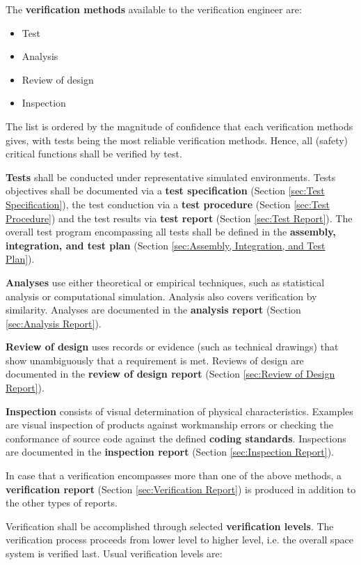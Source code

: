 The \textbf{verification methods} available to the verification engineer are:

\begin{itemize}
\item Test
\item Analysis
\item Review of design
\item Inspection
\end{itemize}

The list is ordered by the magnitude of confidence that each verification methods gives, with tests being the most reliable verification methods. Hence, all (safety) critical functions shall be verified by test.

\textbf{Tests} shall be conducted under representative simulated environments. Tests objectives shall be documented via a \textbf{test specification} (Section \ref{sec:Test Specification}), the test conduction via a \textbf{test procedure} (Section \ref{sec:Test Procedure}) and the test results via \textbf{test report} (Section \ref{sec:Test Report}). The overall test program encompassing all tests shall be defined in the \textbf{assembly, integration, and test plan} (Section \ref{sec:Assembly, Integration, and Test Plan}).

\textbf{Analyses} use either theoretical or empirical techniques, such as statistical analysis or computational simulation. Analysis also covers verification by similarity. Analyses are documented in the \textbf{analysis report} (Section \ref{sec:Analysis Report}).

\textbf{Review of design} uses records or evidence (such as technical drawings) that show unambiguously that a requirement is met. Reviews of design are documented in the \textbf{review of design report} (Section \ref{sec:Review of Design Report}).

\textbf{Inspection} consists of visual determination of physical characteristics. Examples are visual inspection of products against workmanship errors or checking the conformance of source code against the defined \textbf{coding standards}. Inspections are documented in the \textbf{inspection report} (Section \ref{sec:Inspection Report}).

In case that a verification encompasses more than one of the above methods, a \textbf{verification report} (Section \ref{sec:Verification Report}) is produced in addition to the other types of reports.

Verification shall be accomplished through selected \textbf{verification levels}. The verification process proceeds from lower level to higher level, i.e. the overall space system is verified last. Usual verification levels are:

